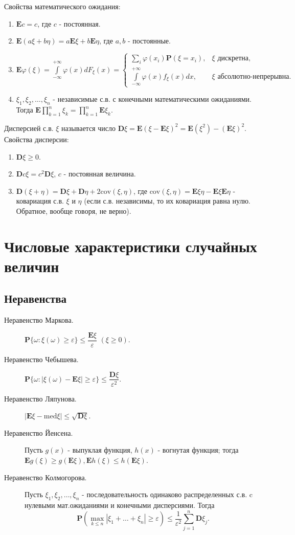 \documentclass[a4paper,12pt]{scrartcl}
\newcommand{\E}{\mathbf{E}}
\newcommand{\D}{\mathbf{D}}
\newcommand{\Prb}{\mathbf{P}}
\begin{document}
Свойства математического ожидания:
\begin{enumerate}
\item $\E c = c$, где $c$ - постоянная.
\item $\E(a\xi + b\eta) = a\E\xi + b\E\eta$, где $a,b$ - постоянные.
\item $\E\varphi(\xi) = \int\limits_{-\infty}^{+\infty}\varphi(x) dF_\xi(x) = \begin{cases} \sum\limits_i \varphi(x_i)\Prb(\xi=x_i),& \xi\text{ дискретна,}\\ \int\limits_{-\infty}^{+\infty}\varphi(x)f_\xi(x)dx, & \xi \text{ абсолютно-непрерывна.} \end{cases}$
\item $\xi_1,\xi_2,\ldots,\xi_n$ - независимые с.в. с конечными математическими ожиданиями. Тогда
$\E\prod\limits_{k=1}^{n}\xi_k =\prod\limits_{k=1}^{n}\E\xi_k$.
\end{enumerate}
Дисперсией с.в. $\xi$ называется число $\D\xi = \E(\xi - \E\xi)^2 = \E(\xi^2)-(\E\xi)^2$. Свойства дисперсии:
\begin{enumerate}
\item $\D\xi \geqslant 0$.
\item $\D c\xi = c^2\D\xi$, $c$ - постоянная величина.
\item $\D(\xi+\eta) = \D\xi+\D\eta +2\text{cov}(\xi,\eta)$, где $\text{cov}(\xi,\eta) = \E\xi\eta - \E\xi\E\eta$ - ковариация с.в. $\xi$ и $\eta$ (если с.в. независимы, то их ковариация равна нулю. Обратное, вообще говоря, не верно).
\end{enumerate}
\section{Числовые характеристики случайных величин}
\subsection{Неравенства}
\begin{description}
\item[Неравенство Маркова.] $\Prb\{\omega:\xi(\omega) \geqslant \varepsilon\}
\leqslant \dfrac{\E\xi}{\varepsilon}$  $(\xi \geqslant 0)$.
\item [Неравенство Чебышева.] $\Prb\{\omega:|\xi(\omega) -\E\xi| \geqslant \varepsilon\} \leqslant \dfrac{\D\xi}{\varepsilon^2}$.
\item [Неравенство Ляпунова.] $|\E\xi - \text{med}\xi| \leqslant \sqrt{\D\xi}$.
\item [Неравенство Йенсена.] Пусть $g(x)$ - выпуклая функция, $h(x)$ - вогнутая функция; тогда $\E g(\xi) \geqslant g(\E\xi), \E h(\xi) \leqslant h(\E\xi)$.
\item [Неравенство Колмогорова.] Пусть $\xi_1,\xi_2,\ldots,\xi_n$ - последовательность одинаково распределенных с.в. c нулевыми мат.ожиданиями и конечными дисперсиями. Тогда
$$\Prb(\max\limits_{k \leqslant n}|\xi_1 + \ldots + \xi_n| \geqslant \varepsilon) \leqslant \dfrac{1}{\varepsilon^2}\sum\limits_{j=1}^{n}\D\xi_j.$$
\end{description}
\end{document}
